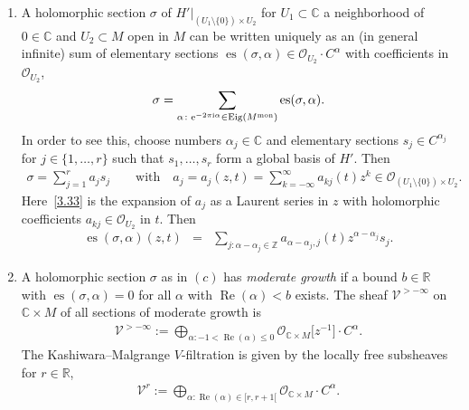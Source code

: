 \documentclass[pdftex]{sigma}%
\numberwithin{equation}{section}
\numberwithin{figure}{section}
\newcommand{\Z}{{\mathbb Z}}
\newcommand{\C}{{\mathbb C}}
\newcommand{\R}{{\mathbb R}}
\newcommand{\OO}{{\mathcal O}}
\newcommand{\VV}{{\mathcal V}}
\DeclareMathOperator{\Eig}{Eig}
\DeclareMathOperator{\Ree}{Re}
\begin{document}
\begin{Definition}
\begin{enumerate}
\item[$(c)$] A holomorphic section $\sigma$
of $H'|_{(U_1\setminus\{0\})\times U_2}$ for $U_1\subset \C$
a neighborhood of $0\in\C$ and $U_2\subset M$ open in $M$
can be written uniquely as an (in general infinite) sum
of elementary sections
$\operatorname{es}(\sigma,\alpha)\in \OO_{U_2}\cdot C^\alpha$
with coefficients in $\OO_{U_2}$,
\begin{gather*}%
\sigma = \sum_{\alpha\colon {\rm e}^{-2\pi {\rm i}\alpha}\in\Eig(M^{\rm mon})}
\operatorname{es}(\sigma,\alpha).
\end{gather*}
In order to see this, choose numbers $\alpha_j\in\C$
and elementary sections $s_j\in C^{\alpha_j}$
for $j\in\{1,\dots ,r\}$ such that $s_1,\dots ,s_r$
form a global basis of $H'$. Then
\begin{gather}%
\sigma =\sum_{j=1}^r a_js_j \qquad\text{with}\quad
a_j=a_j(z,t)= \sum_{k=-\infty}^\infty a_{kj}(t)z^k\in
\OO_{(U_1\setminus\{0\})\times U_2}.\label{3.33}
\end{gather}
Here~\eqref{3.33} is the expansion of $a_j$ as a Laurent
series in $z$ with holomorphic coefficients
$a_{kj}\in \OO_{U_2}$ in $t$. Then
\begin{eqnarray*}%
\operatorname{es}(\sigma,\alpha)(z,t)&=& \sum_{j\colon \alpha-\alpha_j\in\Z}
a_{\alpha-\alpha_j,j}(t)z^{\alpha-\alpha_j}s_j.
\end{eqnarray*}

\item[$(d)$] A holomorphic section $\sigma$ as in $(c)$
has {\it moderate growth}
if a bound $b\in\R$ with $\operatorname{es}(\sigma,\alpha)=0$
for all $\alpha$ with $\Ree(\alpha)<b$ exists.
The sheaf $\VV^{>-\infty}$ on $\C\times M$
of all sections of moderate growth is
\begin{gather*}%
\VV^{>-\infty}:= \bigoplus_{\alpha\colon -1<\Ree(\alpha)\leq 0}
\OO_{\C\times M}\big[z^{-1}\big]\cdot C^\alpha.
\end{gather*}
The {Kashiwara--Malgrange $V$-filtration} is given by the
locally free subsheaves for $r\in\R$,
 \begin{gather*}%
\VV^{r}:= \bigoplus_{\alpha\colon \Ree(\alpha)\in[r,r+1[}
\OO_{\C\times M}\cdot C^\alpha.
\end{gather*}
\end{enumerate}

\end{Definition}
\end{document}
